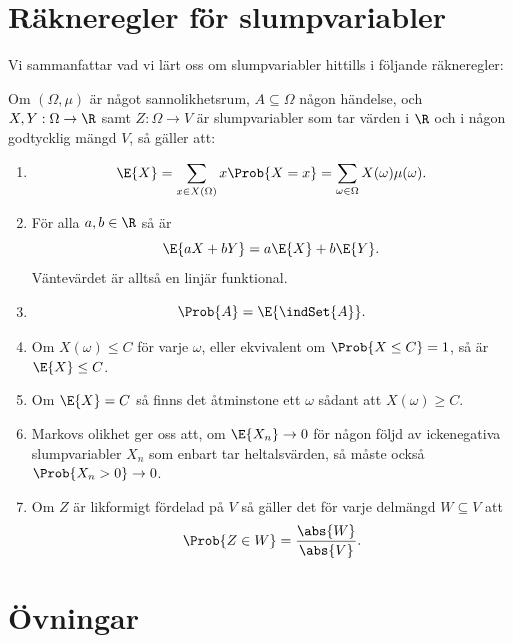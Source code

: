\documentclass[nobib]{tufte-handout}
\begin{document}
\section{Räkneregler för slumpvariabler}

Vi sammanfattar vad vi lärt oss om slumpvariabler hittills i följande räkneregler:

\begin{lemma}
    Om $(\Omega, \mu)$ är något sannolikhetsrum, $A \subseteq \Omega$ någon händelse, och $X, Y: \Omega \to \R$ samt $Z: \Omega \to V$ är slumpvariabler som tar värden i $\R$ och i någon godtycklig mängd $V$, så gäller att:
    \begin{enumerate}
        \item $$\E{X} = \sum_{x \in X(\Omega)} x \Prob{X = x} = \sum_{\omega \in \Omega} X(\omega)\mu(\omega).$$
        \item För alla $a, b \in \R$ så är
        $$\E{aX + bY} = a\E{X} + b\E{Y}.$$
        Väntevärdet är alltså en linjär funktional.
        \item $$\Prob{A} = \E{\indSet{A}}.$$
        \item Om $X(\omega) \leq C$ för varje $\omega$, eller ekvivalent om $\Prob{X \leq C} = 1$, så är $\E{X} \leq C$.
        \item Om $\E{X} = C$ så finns det åtminstone ett $\omega$ sådant att $X(\omega) \geq C$.
        \item Markovs olikhet ger oss att, om $\E{X_n} \to 0$ för någon följd av ickenegativa slumpvariabler $X_n$ som enbart tar heltalsvärden, så måste också $\Prob{X_n > 0} \to 0$.
        \item Om $Z$ är likformigt fördelad på $V$ så gäller det för varje delmängd $W \subseteq V$ att
        $$\Prob{Z \in W} = \frac{\abs{W}}{\abs{V}}.$$
    \end{enumerate}
\end{lemma}

\section{Övningar}
\end{document}
